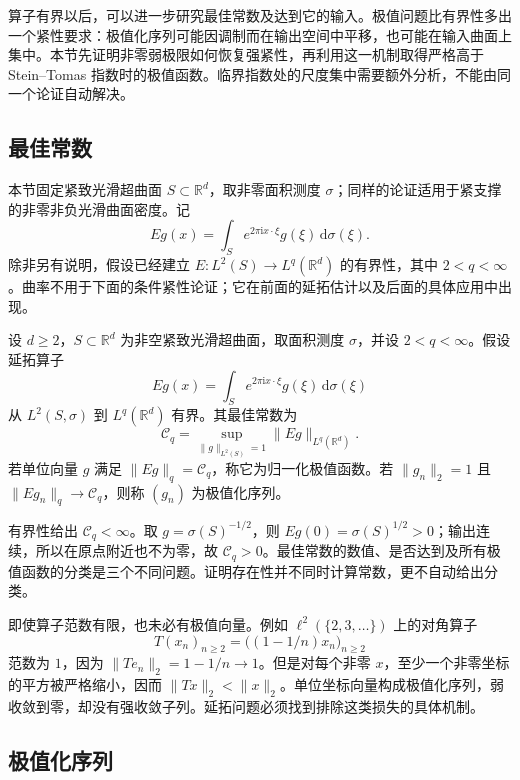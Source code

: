 
算子有界以后，可以进一步研究最佳常数及达到它的输入。极值问题比有界性多出一个紧性要求：极值化序列可能因调制而在输出空间中平移，也可能在输入曲面上集中。本节先证明非零弱极限如何恢复强紧性，再利用这一机制取得严格高于 Stein--Tomas 指数时的极值函数。临界指数处的尺度集中需要额外分析，不能由同一个论证自动解决。

\subsection{最佳常数}
\label{b2:subsec:230501}

本节固定紧致光滑超曲面 \(S\subset\mathbb R^d\)，取非零面积测度 \(\sigma\)；同样的论证适用于紧支撑的非零非负光滑曲面密度。记
\[
 Eg(x)=\int_S e^{2\pi\mathrm i x\cdot\xi}g(\xi)\,\mathrm d\sigma(\xi).
\]
除非另有说明，假设已经建立 \(E:L^2(S)\to L^q(\mathbb R^d)\) 的有界性，其中 \(2<q<\infty\)。曲率不用于下面的条件紧性论证；它在前面的延拓估计以及后面的具体应用中出现。

\begin{definition}[最佳常数与极值函数]\label{b2:def:23-extremizer}
设 \(d\geq2\)，\(S\subset\mathbb R^d\) 为非空紧致光滑超曲面，取面积测度 \(\sigma\)，并设 \(2<q<\infty\)。假设延拓算子
\[
 Eg(x)=\int_S e^{2\pi\mathrm i x\cdot\xi}g(\xi)\,\mathrm d\sigma(\xi)
\]
从 \(L^2(S,\sigma)\) 到 \(L^q(\mathbb R^d)\) 有界。其最佳常数为
\[
 \mathcal C_q=\sup_{\|g\|_{L^2(S)}=1}\|Eg\|_{L^q(\mathbb R^d)}.
\]
若单位向量 \(g\) 满足 \(\|Eg\|_q=\mathcal C_q\)，称它为归一化极值函数。若 \(\|g_n\|_2=1\) 且 \(\|Eg_n\|_q\to\mathcal C_q\)，则称 \((g_n)\) 为极值化序列。
\end{definition}

有界性给出 \(\mathcal C_q<\infty\)。取 \(g=\sigma(S)^{-1/2}\)，则 \(Eg(0)=\sigma(S)^{1/2}>0\)；输出连续，所以在原点附近也不为零，故 \(\mathcal C_q>0\)。最佳常数的数值、是否达到及所有极值函数的分类是三个不同问题。证明存在性并不同时计算常数，更不自动给出分类。

\ProseParagraphBreak
即使算子范数有限，也未必有极值向量。例如 \(\ell^2(\{2,3,\ldots\})\) 上的对角算子
\[
 T(x_n)_{n\geq2}=\bigl((1-1/n)x_n\bigr)_{n\geq2}
\]
范数为 \(1\)，因为 \(\|Te_n\|_2=1-1/n\to1\)。但是对每个非零 \(x\)，至少一个非零坐标的平方被严格缩小，因而 \(\|Tx\|_2<\|x\|_2\)。单位坐标向量构成极值化序列，弱收敛到零，却没有强收敛子列。延拓问题必须找到排除这类损失的具体机制。

\subsection{极值化序列}
\label{b2:subsec:230502}

